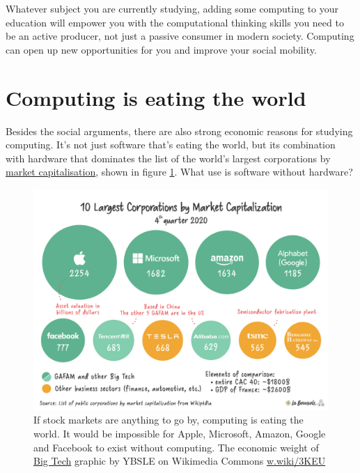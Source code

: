 \documentclass[
]{book}
\begin{document}
Whatever subject you are currently studying, adding some computing to your education will empower you with the computational thinking skills you need to be an active producer, not just a passive consumer in modern society. Computing can open up new opportunities for you and improve your social mobility.

\hypertarget{eating}{%
\section{Computing is eating the world}\label{eating}}

Besides the social arguments, there are also strong economic reasons for studying computing. It's not just software that's eating the world, but its combination with hardware that dominates the list of the world's largest corporations by \href{https://en.wikipedia.org/wiki/Market_capitalization}{market capitalisation}, shown in figure \ref{fig:market-fig}. What use is software without hardware?

\begin{figure}

{\centering \includegraphics[width=1\linewidth]{images/Market_Capitalisation} 

}

\caption{If stock markets are anything to go by, computing is eating the world. It would be impossible for Apple, Microsoft, Amazon, Google and Facebook to exist without computing. The economic weight of \href{https://en.wikipedia.org/wiki/Big_Tech}{Big Tech} graphic by YBSLE on Wikimedia Commons \href{https://w.wiki/3KEU}{w.wiki/3KEU}}\label{fig:market-fig}
\end{figure}
\end{document}
